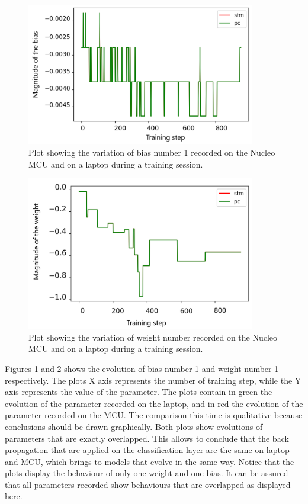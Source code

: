 \documentclass[12pt]{report}
\begin{document}
\begin{figure}[h!]
    \centering
    \includegraphics[width=100mm]{Figures/Chapter5/bias_example.png} 
    \caption{Plot showing the variation of bias number 1 recorded on the Nucleo MCU and on a laptop during a training session.}
    \label{fig:comparison_bias}    
\end{figure}

\begin{figure}[h!]
    \centering
    \includegraphics[width=100mm]{Figures/Chapter5/weight_example.png} 
    \caption{Plot showing the variation of weight number recorded on the Nucleo MCU and on a laptop during a training session.}
    \label{fig:comparison_weights}    
\end{figure}

Figures \ref{fig:comparison_bias} and \ref{fig:comparison_weights} shows the evolution of bias number 1 and weight number 1 respectively. The plots X axis represents the number of training step, while the Y axis represents the value of the parameter. The plots contain in green the evolution of the parameter recorded on the laptop, and in red the evolution of the parameter recorded on the MCU. The comparison this time is qualitative because conclusions should be drawn graphically. Both plots show evolutions of parameters that are exactly overlapped. This allows to conclude that the back propagation that are applied on the classification layer are the same on laptop and MCU, which brings to models that evolve in the same way. Notice that the plots display the behaviour of only one weight and one bias. It can be assured that all parameters recorded show behaviours that are overlapped as displayed here.
\end{document}
